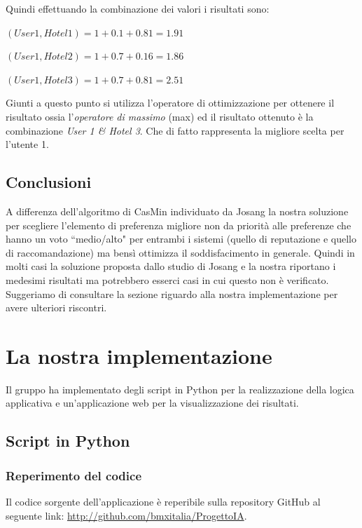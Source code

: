\documentclass{report}
\begin{document}
	Quindi effettuando la combinazione dei valori i risultati sono:
	\newline
	
	$(User1 , Hotel 1) = 1 + 0.1 + 0.81 = 1.91$
	
	$(User 1, Hotel 2) = 1 + 0.7 + 0.16 = 1.86$
	
	$(User 1, Hotel 3) = 1 + 0.7 + 0.81 = 2.51$
	\newline
	
	Giunti a questo punto si utilizza l'operatore di ottimizzazione per
	ottenere il risultato ossia l'\emph{operatore di massimo} (max) ed il
	risultato ottenuto è la combinazione \emph{User 1 \& Hotel 3}. Che di
	fatto rappresenta la migliore scelta per l'utente 1.
	
	\hypertarget{header-n280}{%
		\subsection{Conclusioni}\label{header-n280}}
	
	A differenza dell'algoritmo di CasMin individuato da Josang la nostra
	soluzione per scegliere l'elemento di preferenza migliore non da
	priorità alle preferenze che hanno un voto ``medio/alto" per entrambi i
	sistemi (quello di reputazione e quello di raccomandazione) ma bensì
	ottimizza il soddisfacimento in generale. Quindi in molti casi la
	soluzione proposta dallo studio di Josang e la nostra riportano i
	medesimi risultati ma potrebbero esserci casi in cui questo non è
	verificato. Suggeriamo di consultare la sezione riguardo alla nostra
	implementazione per avere ulteriori riscontri.
	
	\hypertarget{header-n284}{%
		\section{La nostra implementazione}\label{header-n284}}
		Il gruppo ha implementato degli script in Python per la realizzazione della logica applicativa
		e un'applicazione web per la visualizzazione dei risultati.
		
		\subsection{Script in Python}
		\subsubsection{Reperimento del codice}
		Il codice sorgente dell'applicazione è reperibile sulla repository GitHub al seguente link: \url{http://github.com/bmxitalia/ProgettoIA}.
		
\end{document}
